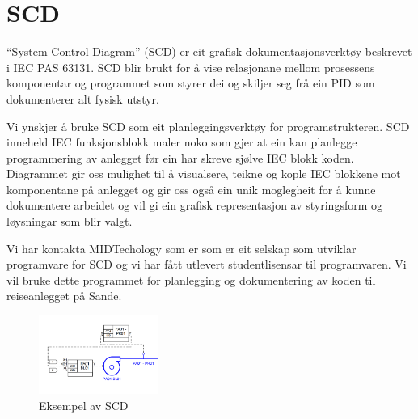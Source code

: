 \section{SCD}
\thispagestyle{fancy}


``System Control Diagram'' (\gls{SCD})  er eit grafisk dokumentasjonsverktøy beskrevet i \gls{IEC} \gls{PAS} 63131.\newline
 \gls{SCD} blir brukt for å vise relasjonane mellom prosessens komponentar og programmet som styrer dei og skiljer seg frå ein \gls{PID}
 som dokumenterer alt fysisk utstyr.

 Vi ynskjer å bruke \gls{SCD} som eit planleggingsverktøy for programstrukteren. \gls{SCD} inneheld \gls{IEC} funksjonsblokk maler noko som gjer at ein kan
 planlegge programmering av anlegget før ein har skreve sjølve \gls{IEC} blokk koden.
 Diagrammet gir oss mulighet til å visualsere, teikne og kople \gls{IEC} blokkene mot komponentane på anlegget og 
 gir oss også ein unik moglegheit for å kunne dokumentere arbeidet og vil gi ein grafisk representasjon
 av styringsform og løysningar som blir valgt.

 Vi har kontakta MIDTechology \citep{MIDT} som er som er eit selskap som utviklar programvare for \gls{SCD} og vi har fått utlevert studentlisensar
 til programvaren. Vi vil bruke dette programmet for planlegging og dokumentering av koden til reiseanlegget på Sande.

 \begin{figure}[htbp]
    \centering
    \includegraphics[width=0.35\textwidth]{Bilder/Visio_eksempel.png}
    \caption{Eksempel av \gls{SCD}}\label{fig:SCD eksempel}    
\end{figure}

\newpage